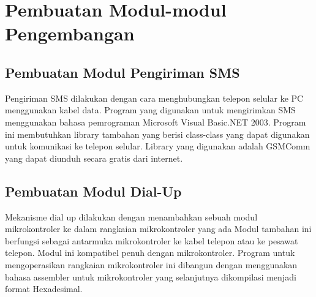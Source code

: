 \documentclass[12pt,a4paper]{article}
\begin{document}
\section{Pembuatan Modul-modul Pengembangan}
\subsection{Pembuatan Modul Pengiriman SMS}
Pengiriman SMS dilakukan dengan cara menghubungkan telepon selular ke PC menggunakan kabel data. 
Program yang digunakan untuk mengirimkan SMS menggunakan bahasa pemrograman Microsoft Visual Basic.NET 2003. Program ini membutuhkan library tambahan yang berisi class-class yang dapat digunakan untuk komunikasi ke telepon selular. Library yang digunakan adalah GSMComm yang dapat diunduh secara gratis dari internet. 
\subsection{Pembuatan Modul Dial-Up}
Mekanisme dial up dilakukan dengan menambahkan sebuah modul mikrokontroler ke dalam rangkaian mikrokontroler yang ada
Modul tambahan ini berfungsi sebagai antarmuka mikrokontroler ke kabel telepon atau ke pesawat telepon. Modul ini kompatibel penuh dengan mikrokontroler. 
Program untuk mengoperasikan rangkaian mikrokontroler ini dibangun dengan menggunakan bahasa assembler untuk mikrokontroler yang selanjutnya dikompilasi menjadi format Hexadesimal.
\end{document}

